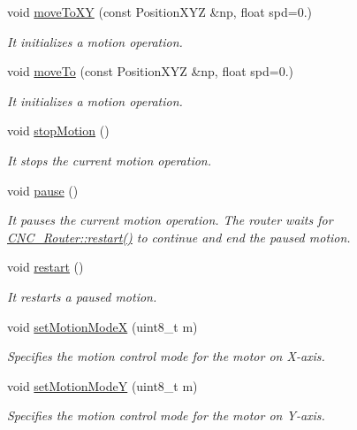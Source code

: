 \begin{DoxyCompactItemize}
void \hyperlink{class_c_n_c___router_a3f6bcafb0e7ce2751a7e4a424a99ec7e}{move\+To\+X\+Y} (const Position\+X\+Y\+Z \&np, float spd=0.)
\begin{DoxyCompactList}\small\item\em It initializes a motion operation. \end{DoxyCompactList}\item 
void \hyperlink{class_c_n_c___router_a7bb1accca615b13aadd050dfec1031e6}{move\+To} (const Position\+X\+Y\+Z \&np, float spd=0.)
\begin{DoxyCompactList}\small\item\em It initializes a motion operation. \end{DoxyCompactList}\item 
void \hyperlink{class_c_n_c___router_aebacab02935c41a4c11b926c0770bcac}{stop\+Motion} ()
\begin{DoxyCompactList}\small\item\em It stops the current motion operation. \end{DoxyCompactList}\item 
void \hyperlink{class_c_n_c___router_a6b5ad1a227e63d3f374e0e53f3cf047c}{pause} ()
\begin{DoxyCompactList}\small\item\em It pauses the current motion operation. The router waits for \hyperlink{class_c_n_c___router_ab36f29523c76dd9f64c1ab5367c8f3d3}{C\+N\+C\+\_\+\+Router\+::restart()} to continue and end the paused motion. \end{DoxyCompactList}\item 
void \hyperlink{class_c_n_c___router_ab36f29523c76dd9f64c1ab5367c8f3d3}{restart} ()
\begin{DoxyCompactList}\small\item\em It restarts a paused motion. \end{DoxyCompactList}\item 
void \hyperlink{class_c_n_c___router_a6fd3b892aa1730dc2cb79bc91c0e90b6}{set\+Motion\+Mode\+X} (uint8\+\_\+t m)
\begin{DoxyCompactList}\small\item\em Specifies the motion control mode for the motor on X-\/axis. \end{DoxyCompactList}\item 
void \hyperlink{class_c_n_c___router_a42148bff778d0dbd45b37f7a09b61382}{set\+Motion\+Mode\+Y} (uint8\+\_\+t m)
\begin{DoxyCompactList}\small\item\em Specifies the motion control mode for the motor on Y-\/axis. \end{DoxyCompactList}\item 

\end{DoxyCompactItemize}
